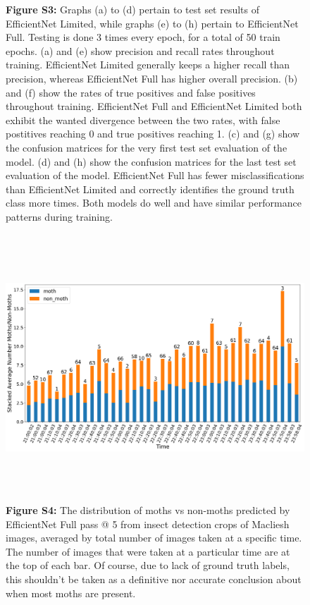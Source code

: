 \documentclass[twocolumn]{article}
\begin{document}
\clearpage 
\begin{figure}[h]  %
    \captionsetup{width=0.9\textwidth}
    \caption*{\textbf{Figure S3:} Graphs (a) to (d) pertain to
    test set results of EfficientNet Limited, while graphs (e) to (h) pertain to EfficientNet Full.
    Testing is done 3 times every epoch, for a total of 50 train epochs. \newline
    (a) and (e) show precision and recall rates throughout training. 
    EfficientNet Limited generally keeps a higher recall than precision, whereas EfficientNet Full has 
    higher overall precision. \newline 
    (b) and (f) show the rates of true positives and false positives throughout training.
    EfficientNet Full and EfficientNet Limited both exhibit the wanted divergence between the two rates,
    with false postitives reaching 0 and true positives reaching 1. \newline
    (c) and (g) show the confusion matrices for the very first test set evaluation of the model. \newline
    (d) and (h) show the confusion matrices for the last test set evaluation of the model. 
    EfficientNet Full has fewer misclassifications than EfficientNet Limited and correctly identifies the
    ground truth class more times.
    \newline
    Both models do well and have similar performance patterns during training.
    } 
\end{figure}
\newpage
\begin{figure}[h]
    \includegraphics[width=16cm, height=10cm]{imgs/moth_non_moth_final.png}
    \captionsetup{width=0.9\textwidth}
    \caption*{\textbf{Figure S4:} The distribution of moths vs non-moths predicted by 
    EfficientNet Full pass @ 5 from insect detection crops of Macliesh images, averaged by total number of images taken at a specific time.
    The number of images that were taken at a particular time are at the top of each bar.
     Of course, due to lack of ground truth labels, this shouldn't be taken as a definitive 
    nor accurate conclusion about when most moths are present.} 
\end{figure} 
\end{document}
